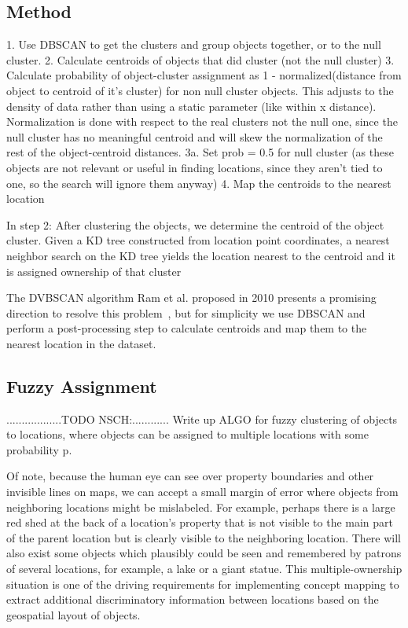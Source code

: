 \subsection{Method}
1. Use DBSCAN to get the clusters and group objects together, or to the null cluster.
2. Calculate centroids of objects that did cluster (not the null cluster)
3. Calculate probability of object-cluster assignment as 1 - normalized(distance from object to centroid of it's cluster) for non null cluster objects. This adjusts to the density of data rather than using a static parameter (like within x distance). Normalization is done with respect to the real clusters not the null one, since the null cluster has no meaningful centroid and will skew the normalization of the rest of the object-centroid distances.
3a. Set prob = 0.5 for null cluster (as these objects are not relevant or useful in finding locations, since they aren't tied to one, so the search will ignore them anyway)
4. Map the centroids to the nearest location


In step 2: After clustering the objects, we determine the centroid of the object cluster. Given a KD tree constructed from location point coordinates, a nearest neighbor search on the KD tree yields the location nearest to the centroid and it is assigned ownership of that cluster

The DVBSCAN algorithm Ram et al. proposed in 2010 presents a promising direction to resolve this problem~\cite{Ram2010}, but for simplicity we use DBSCAN and perform a post-processing step to calculate centroids and map them to the nearest location in the dataset. 

\subsection{Fuzzy Assignment} \label{subsection:fuzzy_asn}
..................TODO NSCH:............ Write up ALGO for fuzzy clustering of objects to locations, where objects can be assigned to multiple locations with some probability p.

Of note, because the human eye can see over property boundaries and other invisible lines on maps, we can accept a small margin of error where objects from neighboring locations might be mislabeled. For example, perhaps there is a large red shed at the back of a location's property that is not visible to the main part of the parent location but is clearly visible to the neighboring location.
There will also exist some objects which plausibly could be seen and remembered by patrons of several locations, for example, a lake or a giant statue. 
This multiple-ownership situation is one of the driving requirements for implementing concept mapping to extract additional discriminatory information between locations based on the geospatial layout of objects.


